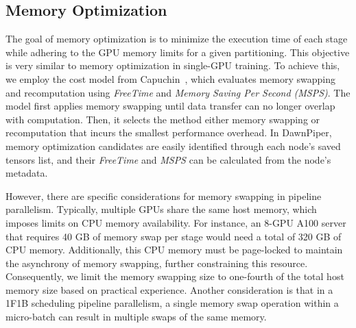 \subsection{Memory Optimization}
The goal of memory optimization is to minimize the execution time of each stage
while adhering to the GPU memory limits for a given partitioning.
This objective is very similar to memory optimization in single-GPU training.
To achieve this, we employ the cost model from Capuchin~\cite{pengCapuchinTensorbasedGPU2020},
which evaluates memory swapping and recomputation using \emph{FreeTime} and \emph{Memory Saving Per Second (MSPS)}.
The model first applies memory swapping until data transfer can no longer overlap with computation.
Then, it selects the method either memory swapping or recomputation that incurs the smallest performance overhead.
In DawnPiper, memory optimization candidates are easily identified through each node's saved tensors list,
and their \emph{FreeTime} and \emph{MSPS} can be calculated from the node’s metadata.

However, there are specific considerations for memory swapping in pipeline parallelism.
Typically, multiple GPUs share the same host memory, which imposes limits on CPU memory availability.
For instance, an 8-GPU A100 server that requires 40 GB of memory swap per stage
would need a total of 320 GB of CPU memory.
Additionally, this CPU memory must be page-locked to maintain the asynchrony of memory swapping,
further constraining this resource.
Consequently, we limit the memory swapping size to one-fourth of the total host memory size based on practical experience.
Another consideration is that in a 1F1B scheduling pipeline parallelism,
a single memory swap operation within a micro-batch can result in multiple swaps of the same memory.


